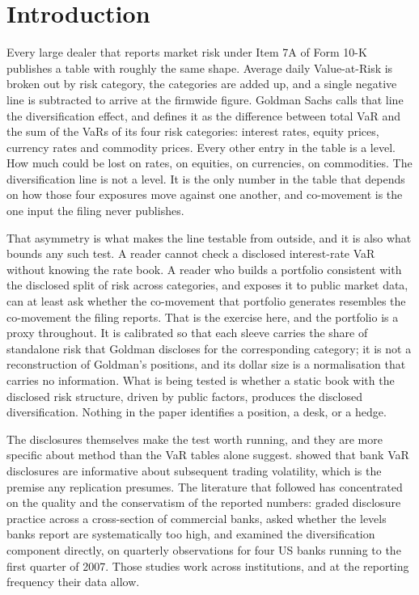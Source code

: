 
\section{Introduction}\label{sec:introduction}

Every large dealer that reports market risk under Item 7A of Form 10-K
publishes a table with roughly the same shape. Average daily Value-at-Risk is
broken out by risk category, the categories are added up, and a single negative
line is subtracted to arrive at the firmwide figure. Goldman Sachs calls that
line the diversification effect, and defines it as the difference between total
VaR and the sum of the VaRs of its four risk categories: interest rates, equity
prices, currency rates and commodity prices. Every other entry in the table is
a level. How much could be lost on rates, on equities, on currencies, on
commodities. The diversification line is not a level. It is the only number in
the table that depends on how those four exposures move against one another,
and co-movement is the one input the filing never publishes.

That asymmetry is what makes the line testable from outside, and it is also
what bounds any such test. A reader cannot check a disclosed interest-rate VaR
without knowing the rate book. A reader who builds a portfolio consistent with
the disclosed split of risk across categories, and exposes it to public market
data, can at least ask whether the co-movement that portfolio generates
resembles the co-movement the filing reports. That is the exercise here, and
the portfolio is a proxy throughout. It is calibrated so that each sleeve
carries the share of standalone risk that Goldman discloses for the
corresponding category; it is not a reconstruction of Goldman's positions, and
its dollar size is a normalisation that carries no information. What is being
tested is whether a static book with the disclosed risk structure, driven by
public factors, produces the disclosed diversification. Nothing in the paper
identifies a position, a desk, or a hedge.

The disclosures themselves make the test worth running, and they are more
specific about method than the VaR tables alone suggest.
\citet{jorion2002informative} showed that bank VaR disclosures are informative
about subsequent trading volatility, which is the premise any replication
presumes. The literature that followed has concentrated on the quality and the
conservatism of the reported numbers: \citet{perignon2010level} graded
disclosure practice across a cross-section of commercial banks,
\citet{perignon2008overstate} asked whether the levels banks report are
systematically too high, and \citet{perignon2010diversification} examined the
diversification component directly, on quarterly observations for four US banks
running to the first quarter of 2007. Those studies work across institutions,
and at the reporting frequency their data allow.

